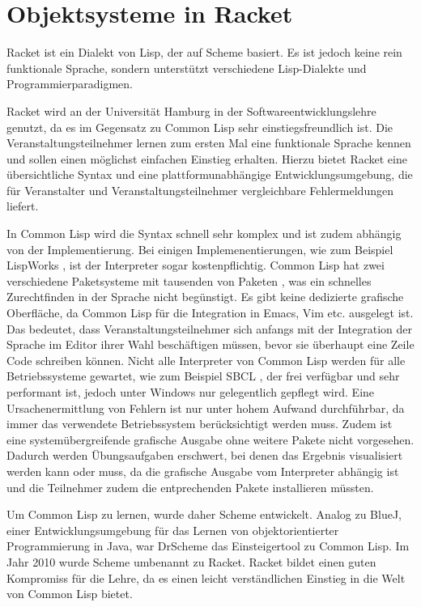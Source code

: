 \chapter{Objektsysteme in Racket}
Racket ist ein Dialekt von Lisp, der auf Scheme basiert. Es ist jedoch keine rein funktionale Sprache, sondern unterstützt verschiedene Lisp-Dialekte und  Programmierparadigmen. 

Racket wird an der Universität Hamburg in der Softwareentwicklungslehre genutzt, da es im Gegensatz zu Common Lisp sehr einstiegsfreundlich ist. Die Veranstaltungsteilnehmer lernen zum ersten Mal eine funktionale Sprache kennen und sollen einen möglichst einfachen Einstieg erhalten. Hierzu bietet Racket eine übersichtliche Syntax und eine plattformunabhängige Entwicklungsumgebung, die für Veranstalter und Veranstaltungsteilnehmer vergleichbare Fehlermeldungen liefert.

In Common Lisp wird die Syntax schnell sehr komplex und ist zudem abhängig von der Implementierung. Bei einigen Implemenentierungen, wie zum Beispiel LispWorks \cite{lispworks}, ist der Interpreter sogar kostenpflichtig. Common Lisp hat zwei verschiedene Paketsysteme mit tausenden von Paketen \cite{asdf}\cite{quicklisp}, was ein schnelles Zurechtfinden in der Sprache nicht begünstigt. Es gibt keine dedizierte grafische Oberfläche, da Common Lisp für die Integration in Emacs, Vim etc. ausgelegt ist. Das bedeutet, dass Veranstaltungsteilnehmer sich anfangs mit der Integration der Sprache im Editor ihrer Wahl beschäftigen müssen, bevor sie überhaupt eine Zeile Code schreiben können. Nicht alle Interpreter von Common Lisp werden  für alle Betriebssysteme gewartet, wie zum Beispiel SBCL \cite{sbcl}, der frei verfügbar und sehr performant ist, jedoch unter Windows nur gelegentlich gepflegt wird. Eine Ursachenermittlung von Fehlern ist nur unter hohem Aufwand durchführbar, da immer das verwendete Betriebssystem berücksichtigt werden muss. Zudem ist eine systemübergreifende grafische Ausgabe ohne weitere Pakete nicht vorgesehen. Dadurch werden Übungsaufgaben erschwert, bei denen das Ergebnis visualisiert werden kann oder muss, da die grafische Ausgabe vom Interpreter abhängig ist und die Teilnehmer zudem die entprechenden Pakete installieren müssten. 

Um Common Lisp zu lernen, wurde daher Scheme entwickelt. Analog zu BlueJ, einer Entwicklungsumgebung für das Lernen von objektorientierter Programmierung in Java, war DrScheme das Einsteigertool zu Common Lisp. Im Jahr 2010 wurde Scheme umbenannt zu Racket. Racket bildet einen guten Kompromiss für die Lehre, da es einen leicht verständlichen Einstieg in die Welt von Common Lisp bietet.

